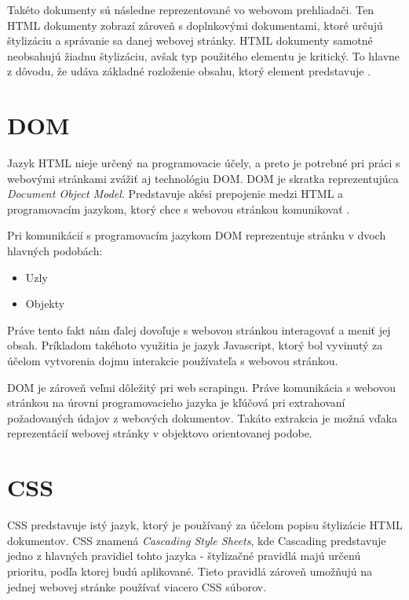 Takéto dokumenty sú následne reprezentované vo webovom prehliadači. Ten HTML dokumenty zobrazí zároveň s doplnkovými dokumentami, ktoré určujú štylizáciu a správanie sa danej webovej stránky. HTML dokumenty samotné neobsahujú žiadnu štylizáciu, avšak typ použitého elementu je kritický. To hlavne z dôvodu, že udáva základné rozloženie obsahu, ktorý element predstavuje \cite{WhatisHTML}.

\section{DOM}
\label{DOM}

Jazyk HTML nieje určený na programovacie účely, a preto je potrebné pri práci s webovými stránkami zvážiť aj technológiu DOM. DOM je skratka reprezentujúca \textit{Document Object Model}. Predstavuje akési prepojenie medzi HTML a programovacím jazykom, ktorý chce s webovou stránkou komunikovať \cite{DOM}.

Pri komunikácií s programovacím jazykom DOM reprezentuje stránku v dvoch hlavných podobách:

\begin{itemize}
    \item {Uzly}
    \item {Objekty}
\end{itemize}

Práve tento fakt nám ďalej dovoľuje s webovou stránkou interagovať a meniť jej obsah. Príkladom takéhoto využitia je jazyk Javascript, ktorý bol vyvinutý za účelom vytvorenia dojmu interakcie používateľa s webovou stránkou. 

DOM je zároveň veľmi dôležitý pri web scrapingu. Práve komunikácia s webovou stránkou na úrovni programovacieho jazyka je kľúčová pri extrahovaní požadovaných údajov z webových dokumentov. Takáto extrakcia je možná vďaka reprezentácií webovej stránky v objektovo orientovanej podobe.

\section{CSS}

CSS predstavuje istý jazyk, ktorý je používaný za účelom popisu štylizácie HTML dokumentov. CSS znamená \textit{Cascading Style Sheets}, kde Cascading predstavuje jedno z hlavných pravidiel tohto jazyka - štylizačné pravidlá majú určenú prioritu, podľa ktorej budú aplikované. Tieto pravidlá zároveň umožňujú na jednej webovej stránke používať viacero CSS súborov. 

